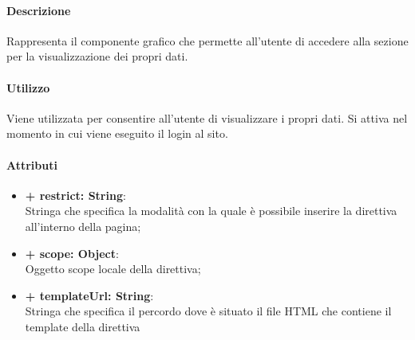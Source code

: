 	\paragraph{Descrizione}
	Rappresenta il componente grafico che permette all'utente di accedere alla sezione per la visualizzazione dei propri dati.
	
	\paragraph{Utilizzo}
	Viene utilizzata per consentire all'utente di visualizzare i propri dati. Si attiva nel momento in cui viene eseguito il login al sito.
	
	\paragraph{Attributi}
	\begin{itemize}
		\item \textbf{+ restrict: String}:\\
		Stringa che specifica la modalità con la quale è possibile inserire la direttiva all'interno della pagina;
		\item \textbf{+ scope: Object}:\\
		Oggetto scope locale della direttiva;
		\item \textbf{+ templateUrl: String}:\\
		Stringa che specifica il percordo dove è situato il file HTML che contiene il template della direttiva
	\end{itemize}
\newpage